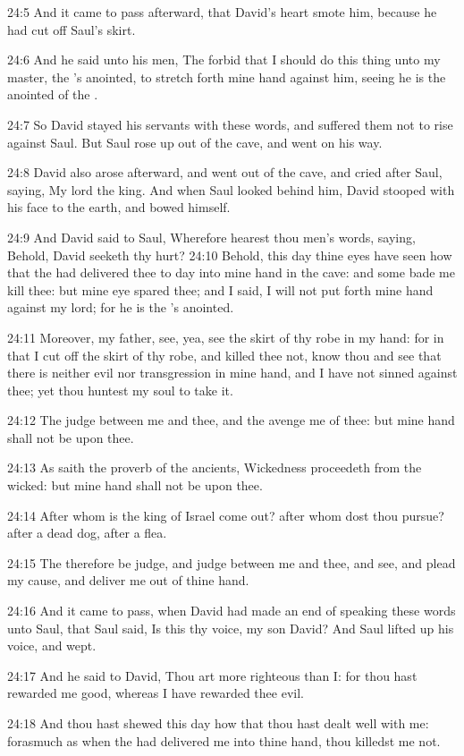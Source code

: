 24:5 And it came to pass afterward, that David's heart smote him, because he had cut off Saul's skirt.

24:6 And he said unto his men, The \LORD forbid that I should do this thing unto my master, the \LORD's anointed, to stretch forth mine hand against him, seeing he is the anointed of the \LORD.

24:7 So David stayed his servants with these words, and suffered them not to rise against Saul. But Saul rose up out of the cave, and went on his way.

24:8 David also arose afterward, and went out of the cave, and cried after Saul, saying, My lord the king. And when Saul looked behind him, David stooped with his face to the earth, and bowed himself.

24:9 And David said to Saul, Wherefore hearest thou men's words, saying, Behold, David seeketh thy hurt?  24:10 Behold, this day thine eyes have seen how that the \LORD had delivered thee to day into mine hand in the cave: and some bade me kill thee: but mine eye spared thee; and I said, I will not put forth mine hand against my lord; for he is the \LORD's anointed.

24:11 Moreover, my father, see, yea, see the skirt of thy robe in my hand: for in that I cut off the skirt of thy robe, and killed thee not, know thou and see that there is neither evil nor transgression in mine hand, and I have not sinned against thee; yet thou huntest my soul to take it.

24:12 The \LORD judge between me and thee, and the \LORD avenge me of thee: but mine hand shall not be upon thee.

24:13 As saith the proverb of the ancients, Wickedness proceedeth from the wicked: but mine hand shall not be upon thee.

24:14 After whom is the king of Israel come out? after whom dost thou pursue? after a dead dog, after a flea.

24:15 The \LORD therefore be judge, and judge between me and thee, and see, and plead my cause, and deliver me out of thine hand.

24:16 And it came to pass, when David had made an end of speaking these words unto Saul, that Saul said, Is this thy voice, my son David? And Saul lifted up his voice, and wept.

24:17 And he said to David, Thou art more righteous than I: for thou hast rewarded me good, whereas I have rewarded thee evil.

24:18 And thou hast shewed this day how that thou hast dealt well with me: forasmuch as when the \LORD had delivered me into thine hand, thou killedst me not.

